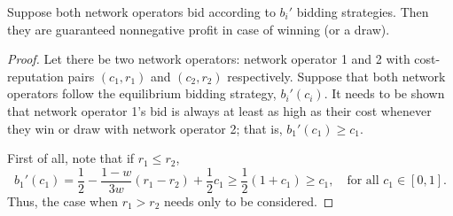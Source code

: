 \begin{propositiona}[\ref{prop:pcomp_negative_bids_direct}]
Suppose both network operators bid according to $b_i'$ bidding strategies. Then they are guaranteed nonnegative profit in case of winning (or a draw).
\end{propositiona}
\begin{proof}
Let there be two network operators: network operator 1 and 2 with cost-reputation pairs $(c_1,r_1)$ and $(c_2,r_2)$ respectively. Suppose that both network operators follow the equilibrium bidding strategy, $b_i'(c_i)$. It needs to be shown that network operator 1's bid is always at least as high as their cost whenever they win or draw with network operator 2; that is, $b_1'(c_1)\ge c_1$.

First of all, note that if $r_1\le r_2$,
\begin{equation}
	b_1'(c_1) = \frac{1}{2}-\frac{1-w}{3w}(r_1-r_2) + \frac{1}{2}c_1 \ge \frac{1}{2}(1+c_1) \ge c_1, \quad\text{for all } c_1\in[0,1].
\end{equation}
Thus, the case when $r_1>r_2$ needs only to be considered.


\end{proof}
